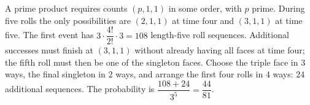 A prime product requires counts $(p,1,1)$ in some order, with $p$ prime. During five rolls the only possibilities are $(2,1,1)$ at time four and $(3,1,1)$ at time five. The first event has $3\cdot\dfrac{4!}{2!}\cdot3=108$ length-five roll sequences. Additional successes must finish at $(3,1,1)$ without already having all faces at time four; the fifth roll must then be one of the singleton faces. Choose the triple face in $3$ ways, the final singleton in $2$ ways, and arrange the first four rolls in $4$ ways: $24$ additional sequences. The probability is $\dfrac{108+24}{3^5}=\boxed{\dfrac{44}{81}}$.
